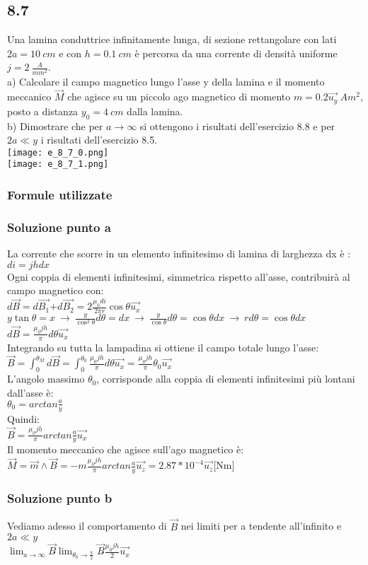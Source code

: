 \documentclass[../../main.tex]{subfiles}
\begin{document}
\subsection*{8.7}
Una lamina conduttrice infinitamente lunga, di sezione rettangolare con lati $2a = 10\ cm$ e con $h=0.1\ cm$ è percorsa da una corrente di densità uniforme $j = 2\ \frac{A}{mm^2}$.
\\a) Calcolare il campo magnetico lungo l'asse y della lamina e il momento meccanico $\vec{M}$ che agisce su un piccolo ago magnetico di momento $m = 0.2\vec{u_y}\ Am^2$, posto a distanza $y_0 = 4\ cm$ dalla lamina.
\\b) Dimostrare che per $a \rightarrow \infty$ si ottengono i risultati dell'esercizio 8.8 e per $2a \ll y$ i risultati dell'esercizio 8.5.
\\\texttt{[image: e\_8\_7\_0.png]}
\\\texttt{[image: e\_8\_7\_1.png]}
\subsubsection*{Formule utilizzate}
\subsubsection*{Soluzione punto a}
La corrente che scorre in un elemento infinitesimo di lamina di larghezza dx è :\\
$di = jhdx$\\
Ogni coppia di elementi infinitesimi, simmetrica rispetto all'asse, contribuirà al campo magnetico con:\\
$d\vec{B} = d\vec{B_1}$$+d\vec{B_2} = 2\frac{\mu_0di}{2\pi r}\cos\theta\vec{u_x}$\\
$y\tan\theta = x\ \rightarrow\ \frac{y}{\cos^2\theta}d\theta = dx\ \rightarrow\ \frac{y}{\cos\theta}d\theta = \cos\theta dx\ \rightarrow\ rd\theta = \cos\theta dx$\\
$d\vec{B} = \frac{\mu_0jh}{\pi}d\theta\vec{u_x}$\\
Integrando su tutta la lampadina si ottiene il campo totale lungo l'asse:\\
$\vec{B} = \int_0^{\theta_M}d\vec{B} = \int_0^{\theta_0}\frac{\mu_0jh}{\pi}d\theta\vec{u_x}=\frac{\mu_0jh}{\pi}\theta_0\vec{u_x}$\\
L'angolo massimo $\theta_0$, corrisponde alla coppia di elementi infinitesimi più lontani dall'asse è:\\
$\theta_0 = arctan\frac{a}{y}$\\
Quindi:\\
$\vec{B} = \frac{\mu_0jh}{\pi}arctan\frac{a}{y}\vec{u_x}$\\
Il momento meccanico che agisce sull'ago magnetico è:\\
$\vec{M} = \vec{m}\wedge\vec{B} = -m\frac{\mu_0jh}{\pi}arctan\frac{a}{y}\vec{u_z}=2.87*10^{-4}\vec{u_z}$[Nm]\\
\subsubsection*{Soluzione punto b}
Vediamo adesso il comportamento di $\vec{B}$ nei limiti per a tendente all'infinito e $2a\ll y$\\
$\lim_{a \to \infty} \vec{B} \tilde{} \lim_{\theta_0\to\frac{\pi}{2}}\vec{B} \tilde{} \frac{\mu_0jh}{2}\vec{u_x}$
\newpage
\end{document}
